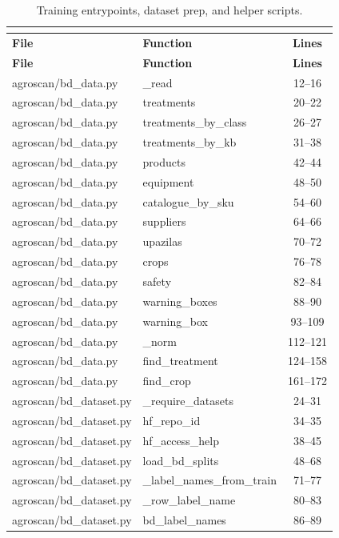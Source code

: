 \begin{center}
\footnotesize
\begin{longtable}{@{}p{4.6cm}p{5.2cm}c@{}}
\caption{Training entrypoints, dataset prep, and helper scripts.}\\
\label{tab:pyrest}\\
\toprule
\textbf{File} & \textbf{Function} & \textbf{Lines} \\
\midrule
\endfirsthead
\toprule
\textbf{File} & \textbf{Function} & \textbf{Lines} \\
\midrule
\endhead
agroscan/bd\_data.py & \_read & 12--16 \\
agroscan/bd\_data.py & treatments & 20--22 \\
agroscan/bd\_data.py & treatments\_by\_class & 26--27 \\
agroscan/bd\_data.py & treatments\_by\_kb & 31--38 \\
agroscan/bd\_data.py & products & 42--44 \\
agroscan/bd\_data.py & equipment & 48--50 \\
agroscan/bd\_data.py & catalogue\_by\_sku & 54--60 \\
agroscan/bd\_data.py & suppliers & 64--66 \\
agroscan/bd\_data.py & upazilas & 70--72 \\
agroscan/bd\_data.py & crops & 76--78 \\
agroscan/bd\_data.py & safety & 82--84 \\
agroscan/bd\_data.py & warning\_boxes & 88--90 \\
agroscan/bd\_data.py & warning\_box & 93--109 \\
agroscan/bd\_data.py & \_norm & 112--121 \\
agroscan/bd\_data.py & find\_treatment & 124--158 \\
agroscan/bd\_data.py & find\_crop & 161--172 \\
agroscan/bd\_dataset.py & \_require\_datasets & 24--31 \\
agroscan/bd\_dataset.py & hf\_repo\_id & 34--35 \\
agroscan/bd\_dataset.py & hf\_access\_help & 38--45 \\
agroscan/bd\_dataset.py & load\_bd\_splits & 48--68 \\
agroscan/bd\_dataset.py & \_label\_names\_from\_train & 71--77 \\
agroscan/bd\_dataset.py & \_row\_label\_name & 80--83 \\
agroscan/bd\_dataset.py & bd\_label\_names & 86--89 \\

\end{longtable}
\end{center}
